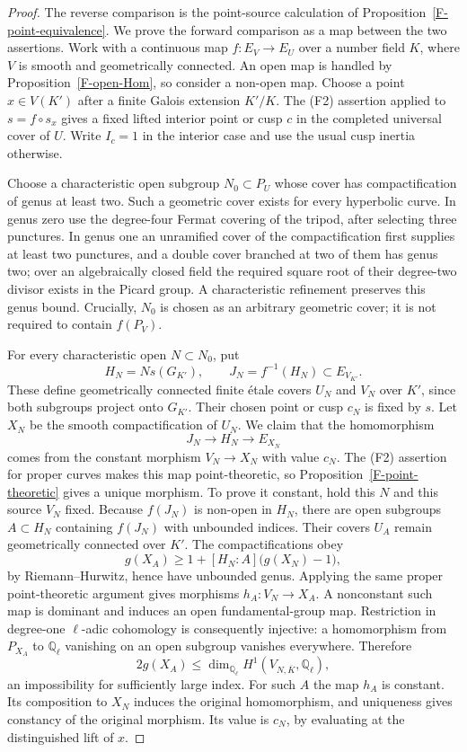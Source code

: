 \documentclass[11pt,oneside]{article}
\begin{document}
\begin{proof}
The reverse comparison is the point-source calculation of
Proposition~\ref{F-point-equivalence}. We prove the forward
comparison as a map between the two assertions. Work with a
continuous map $f:E_V\to E_U$ over a number field $K$, where
$V$ is smooth and geometrically connected. An open map is
handled by Proposition~\ref{F-open-Hom}, so consider a
non-open map. Choose a point $x\in V(K')$ after a finite
Galois extension $K'/K$. The (F2) assertion applied to
$s=f\circ s_x$ gives a fixed lifted interior point or cusp
$c$ in the completed universal cover of $U$. Write $I_c=1$
in the interior case and use the usual cusp inertia otherwise.

Choose a characteristic open subgroup $N_0\subset P_U$ whose
cover has compactification of genus at least two. Such a
geometric cover exists for every hyperbolic curve. In genus
zero use the degree-four Fermat covering of the tripod, after
selecting three punctures. In genus one an unramified cover of
the compactification first supplies at least two punctures,
and a double cover branched at two of them has genus two;
over an algebraically closed field the required square root of
their degree-two divisor exists in the Picard group. A
characteristic refinement preserves this genus bound. Crucially,
$N_0$ is chosen as an arbitrary geometric cover; it is not
required to contain $f(P_V)$.

For every characteristic open $N\subset N_0$, put
\[
 H_N=N s(G_{K'}),\qquad J_N=f^{-1}(H_N)
       \subset E_{V_{K'}}.
\]
These define geometrically connected finite \'etale covers
$U_N$ and $V_N$ over $K'$, since both subgroups project onto
$G_{K'}$. Their chosen point or cusp $c_N$ is fixed by $s$.
Let $X_N$ be the smooth compactification of $U_N$.
We claim that the homomorphism
\[
 J_N\longrightarrow H_N\longrightarrow E_{X_N}
\]
comes from the constant morphism $V_N\to X_N$ with value
$c_N$. The (F2) assertion for proper curves makes this map
point-theoretic, so Proposition~\ref{F-point-theoretic} gives
a unique morphism. To prove it constant, hold this $N$ and
this source $V_N$ fixed. Because $f(J_N)$ is non-open in
$H_N$, there are open subgroups $A\subset H_N$ containing
$f(J_N)$ with unbounded indices. Their covers $U_A$ remain
geometrically connected over $K'$. The compactifications obey
\[
 g(X_A)\geq1+[H_N:A]\bigl(g(X_N)-1\bigr),
\]
by Riemann--Hurwitz, hence have unbounded genus. Applying the
same proper point-theoretic argument gives morphisms
$h_A:V_N\to X_A$. A nonconstant such map is dominant and
induces an open fundamental-group map. Restriction in
degree-one $\ell$-adic cohomology is consequently injective:
a homomorphism from $P_{X_A}$ to $\mathbb Q_\ell$ vanishing
on an open subgroup vanishes everywhere. Therefore
\[
 2g(X_A)\leq \dim_{\mathbb Q_\ell}
       H^1(V_{N,\overline K},\mathbb Q_\ell),
\]
an impossibility for sufficiently large index. For such $A$
the map $h_A$ is constant. Its composition to $X_N$ induces
the original homomorphism, and uniqueness gives constancy of
the original morphism. Its value is $c_N$, by evaluating at
the distinguished lift of $x$.


\end{proof}
\end{document}
